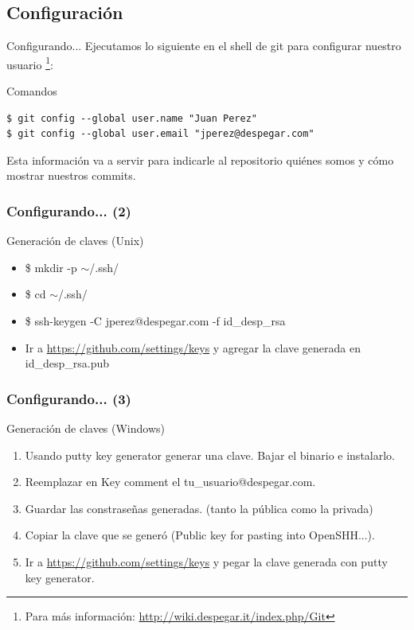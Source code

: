 \documentclass{beamer}
\begin{document}
\subsection{Configuración}
\begin{frame}[fragile]{Configurando...}
  Ejecutamos lo siguiente en el shell de git para configurar nuestro usuario \footnote{Para más información: \url{http://wiki.despegar.it/index.php/Git}}:
  
  \begin{block}{Comandos}
  \begin{verbatim}
$ git config --global user.name "Juan Perez"
$ git config --global user.email "jperez@despegar.com"
  \end{verbatim}
  \end{block}

  Esta información va a servir para indicarle al repositorio quiénes somos y cómo mostrar nuestros commits.
  
\end{frame}

\begin{frame}\frametitle{Configurando... (2)}
  \begin{block}{Generación de claves (Unix)}
  \begin{itemize}
    \item \$ mkdir -p  $\sim$/.ssh/ \pause 
    \item \$ cd $\sim$/.ssh/ \pause 
    \item \$ ssh-keygen -C jperez@despegar.com -f id\_desp\_rsa \pause 
    \item Ir a \url{https://github.com/settings/keys} y agregar la clave generada en id\_desp\_rsa.pub
  \end{itemize}
  \end{block}
  
\end{frame}

\begin{frame}\frametitle{Configurando... (3)}

 \begin{block}{Generación de claves (Windows)}
  \begin{enumerate}
   \item Usando putty key generator generar una clave. Bajar el binario e instalarlo. \pause 
    \item Reemplazar en Key comment el tu\_usuario@despegar.com. \pause 
    \item Guardar las constraseñas generadas. (tanto la pública como la privada) \pause 
    \item Copiar la clave que se generó (Public key for pasting into OpenSHH...). \pause 
    \item Ir a \url{https://github.com/settings/keys} y pegar la clave generada con putty key generator.
  \end{enumerate}

  \end{block}
\end{frame}
\end{document}

